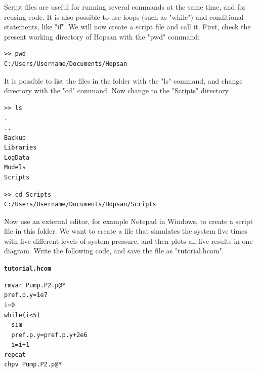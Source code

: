 \documentclass[a4paper,pdftex]{article}
\begin{document}
\begin{tutenumerate}
Script files are useful for running several commands at the same time, and for reusing code. It is also possible to use loops (such as "while") and conditional statements, like "if". We will now create a script file and call it. First, check the present working directory of Hopsan with the "pwd" command:

\vspace{5pt}\hspace{10pt}
\begin{minipage}{0.5\linewidth}
\begin{verbatim}
>> pwd
C:/Users/Username/Documents/Hopsan
\end{verbatim}
\end{minipage}
\vspace{5pt}

It is possible to list the files in the folder with the "ls" command, and change directory with the "cd" command. Now change to the "Scripts" directory.

\vspace{5pt}\hspace{10pt}
\begin{minipage}{0.5\linewidth}
\begin{verbatim}
>> ls
.
..
Backup
Libraries
LogData
Models
Scripts
\end{verbatim}
\end{minipage}
\vspace{5pt}

\vspace{5pt}\hspace{10pt}
\begin{minipage}{0.5\linewidth}
\begin{verbatim}
>> cd Scripts
C:/Users/Username/Documents/Hopsan/Scripts
\end{verbatim}
\end{minipage}
\vspace{5pt}

Now use an external editor, for example Notepad in Windows, to create a script file in this folder. We want to create a file that simulates the system five times with five different levels of system pressure, and then plots all five results in one diagram. Write the following code, and save the file as "tutorial.hcom".

\vspace{5pt}
\texttt{\textbf{tutorial.hcom}}
\vspace{3pt}\\
\hspace{10pt}
\begin{minipage}{0.4\linewidth}
\begin{framed}
\begin{verbatim}
rmvar Pump.P2.p@*
pref.p.y=1e7
i=0
while(i<5)
  sim
  pref.p.y=pref.p.y+2e6
  i=i+1
repeat
chpv Pump.P2.p@*
\end{verbatim}%
\vspace{-10pt}
\end{framed}
\end{minipage}
\vspace{5pt}


\end{tutenumerate}
\end{document}
